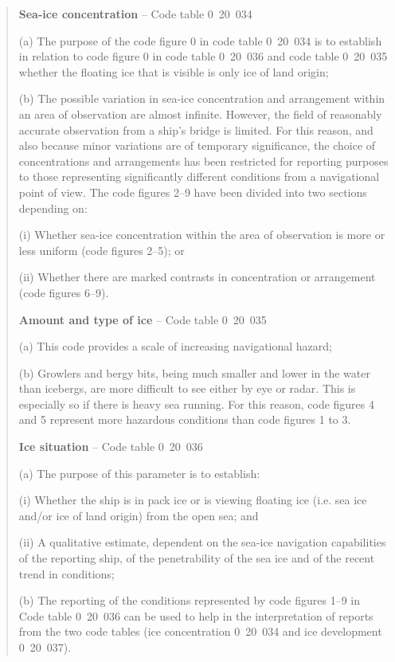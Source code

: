 \begin{quote}
\textbf{Sea-ice concentration} -- Code table 0~20~034

(a) The purpose of the code figure 0 in code table 0~20~034 is to establish in relation to code figure 0 in code table 0~20~036 and code table 0~20~035 whether the floating ice that is visible is only ice of land origin;

(b) The possible variation in sea-ice concentration and arrangement within an area of observation are almost infinite. However, the field of reasonably accurate observation from a ship's bridge is limited. For this reason, and also because minor variations are of temporary significance, the choice of concentrations and arrangements has been restricted for reporting purposes to those representing significantly different conditions from a navigational point of view. The code figures 2--9 have been divided into two sections depending on:

(i) Whether sea-ice concentration within the area of observation is more or less uniform (code figures 2--5); or

(ii) Whether there are marked contrasts in concentration or arrangement (code figures 6--9).

\textbf{Amount and type of ice} -- Code table 0~20~035

(a) This code provides a scale of increasing navigational hazard;

(b) Growlers and bergy bits, being much smaller and lower in the water than icebergs, are more difficult to see either by eye or radar. This is especially so if there is heavy sea running. For this reason, code figures 4 and 5 represent more hazardous conditions than code figures 1 to 3.

\textbf{Ice situation} -- Code table 0~20~036

(a) The purpose of this parameter is to establish:

(i) Whether the ship is in pack ice or is viewing floating ice (i.e. sea ice and/or ice of land origin) from the open sea; and

(ii) A qualitative estimate, dependent on the sea-ice navigation capabilities of the reporting ship, of the penetrability of the sea ice and of the recent trend in conditions;

(b) The reporting of the conditions represented by code figures 1--9 in Code table 0~20~036 can be used to help in the interpretation of reports from the two code tables (ice concentration 0~20~034 and ice development 0~20~037).


\end{quote}
